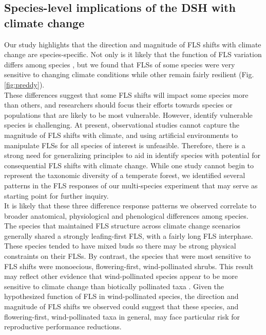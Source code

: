 \documentclass[11pt]{article}
\begin{document}
\subsection*{Species-level implications of the DSH with climate change}
\noindent  Our study highlights that the direction and magnitude of FLS shifts with climate change are species-specific. Not only is it likely that the function of FLS variation differs among species \citep{Buonaiuto2020}, but we found that FLSs of some species were very sensitive to changing climate conditions while other remain fairly resilient (Fig. \ref{fig:preddy}).\\

\noident These differences suggest that some FLS shifts will impact some species more than others, and researchers should focus their efforts towards species or populations that are likely to be most vulnerable. However, identify vulnerable species is challenging. At present, observational studies cannot capture the magnitude of FLS shifts with climate, and using artificial environments to manipulate FLSs for all species of interest is unfeasible. Therefore, there is a strong need for generalizing principles to aid in identify species with potential for consequential FLS shifts with climate change. While one study cannot begin to represent the taxonomic diversity of a temperate forest, we identified several patterns in the FLS responses of our multi-species experiment that may serve as starting point for further inquiry.\\


 
\noindent It is likely that these three difference response patterns we observed correlate to broader anatomical, physiological and phenological differences among species. The species that maintained FLS structure across climate change scenarios generally shared a strongly leafing-first FLS, with a fairly long FLS interphase. These species tended to have mixed buds so there may be strong physical constraints on their FLSs. By contrast, the species that were most sensitive to FLS shifts were monoecious, flowering-first, wind-pollinated shrubs. This result may reflect other evidence that wind-pollinated species appear to be more sensitive to climate change than biotically pollinated taxa \citep{Ziello:2012aa}. Given the hypothesized function of FLS in wind-pollinated species, the direction and magnitude of FLS shifts we observed could suggest that these species, and flowering-first, wind-pollinated taxa in general, may face particular risk for reproductive performance reductions.\\
\end{document}
